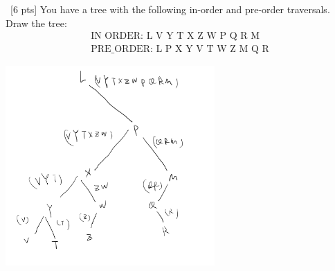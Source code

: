 \documentclass[12pt]{article}
\newenvironment{sol}[1][Solution]{\begin{trivlist}\item[\hskip\labelsep {\bfseries #1:}]}{\end{trivlist}}
\begin{document}
\begin{enumerate}
    \item \ [6 pts] You have a tree with the following in-order and pre-order traversals. Draw the tree:
    \begin{align*}
        \text{IN ORDER: L V Y T X Z W P Q R M}\\
        \text{PRE\_ORDER: L P X Y V T W Z M Q R}
    \end{align*}
    \begin{sol}
    \hspace*{\fill}
                \begin{center}
    \includegraphics[width=0.6\textwidth]{p2.jpeg}
    \end{center} 
    \end{sol}


\end{enumerate}
\end{document}
